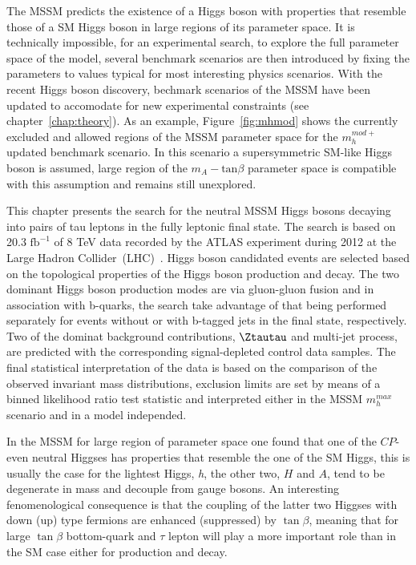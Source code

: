 The MSSM predicts the existence of a Higgs boson with properties that  
resemble those of a SM Higgs boson in large regions of its parameter space. It is technically impossible,
for an experimental  search, to explore the full parameter space of the model, several benchmark scenarios are then 
introduced by fixing the parameters to values typical for most interesting physics scenarios.
With the recent Higgs boson discovery, bechmark scenarios of the MSSM have been updated to 
accomodate for  new experimental constraints (see chapter~\ref{chap:theory}). 
As an example, Figure~\ref{fig:mhmod} shows the currently excluded and allowed regions of the MSSM parameter space
for the  $m_{h}^{mod+}$ updated benchmark scenario. In this scenario a supersymmetric SM-like Higgs boson is assumed, 
large region of the $m_{A} - \text{tan}\beta$ parameter space is compatible with this assumption and remains still unexplored.


This chapter presents the search for the neutral MSSM Higgs bosons decaying into pairs of tau leptons
in the fully leptonic final state. The search is based on 20.3 $\text{fb}^{-1}$ of 8 TeV data 
recorded by the ATLAS experiment during 2012 at the Large Hadron Collider~(LHC)~\cite{LHC}.
Higgs boson candidated events are selected based on the topological properties of the Higgs boson production 
and decay. The two dominant Higgs boson production modes are via gluon-gluon fusion and in association with b-quarks,
the search take advantage of that being performed separately for events without or with b-tagged jets in the final state,
respectively. Two of the dominat background contributions, $\Ztautau$ and multi-jet process, are predicted with 
the corresponding signal-depleted control data samples. The final statistical interpretation of the data is based on the 
comparison of the observed invariant mass distributions, exclusion limits are set by means of a binned likelihood ratio
test statistic and interpreted either in the MSSM $m_{h}^{max}$ scenario and in a model independed.

In the MSSM for large region of parameter space one found that one of the 
$CP$-even neutral Higgses  has properties that resemble the one of the SM Higgs,
this is usually the case for the lightest Higgs, \emph{h}, the other two, $H$ and $A$, 
tend to be degenerate in mass and decouple from gauge bosons.
An interesting fenomenological consequence is that the coupling of the latter
two Higgses with down (up) type fermions are enhanced
(suppressed) by $\tan\beta$, meaning that for large $\tan\beta$
bottom-quark and $\tau$ lepton will play a more important role than in
the SM case either for production and decay.

